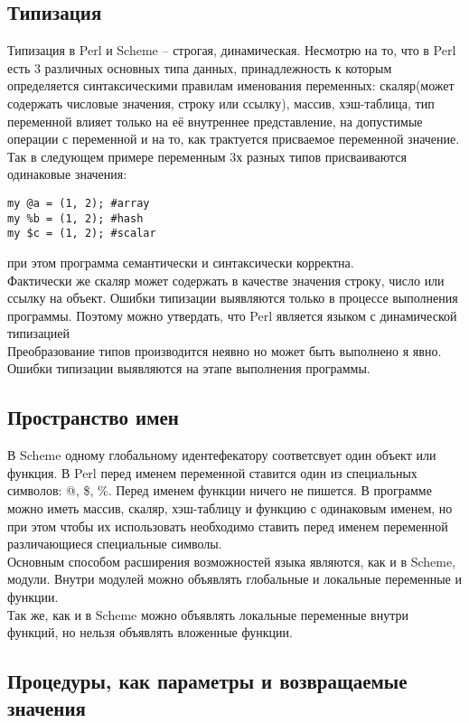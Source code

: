 \documentclass[11pt,a4paper]{article}
\begin{document}
\subsection*{Типизация}

Типизация в Perl и Scheme – строгая, динамическая. Несмотрю на то, что
в Perl есть 3 различных основных типа данных, принадлежность к которым
определяется синтаксическими правилам именования переменных:
скаляр(может содержать 
числовые значения, строку или ссылку), массив, хэш-таблица, тип
переменной влияет только на её внутреннее представление, на допустимые
операции с переменной и на то, как трактуется присваемое переменной
значение. \\
Так в следующем примере переменным 3х разных типов
присваиваются одинаковые значения:
\begin{lstlisting} 
my @a = (1, 2); #array
my %b = (1, 2); #hash
my $c = (1, 2); #scalar
\end{lstlisting} 
при этом программа семантически и синтаксически корректна. \\
Фактически же скаляр может содержать в качестве значения строку, число
или ссылку на объект. Ошибки типизации выявляются только в процессе
выполнения программы. Поэтому можно утвердать, что Perl является
языком с динамической типизацией\\
Преобразование типов производится неявно но может быть
выполнено я явно. Ошибки типизации выявляются на этапе выполнения
программы. 

\subsection*{Пространство имен}

В Scheme одному глобальному идентефекатору соответсвует один объект
или функция. В Perl перед именем переменной ставится один из
специальных символов: @, \$, \%. Перед именем функции ничего не
пишется. В программе можно иметь массив, скаляр, хэш-таблицу и функцию
с одинаковым именем, но при этом чтобы их использовать необходимо
ставить перед именем переменной различающиеся специальные символы. \\
Основным способом расширения возможностей языка являются, как и в
Scheme, модули. Внутри модулей можно объявлять глобальные и локальные
переменные и функции. \\
Так же, как и в Scheme можно объявлять локальные переменные внутри
функций, но нельзя объявлять вложенные функции.  


\subsection*{Процедуры, как параметры и возвращаемые значения}
\end{document}

